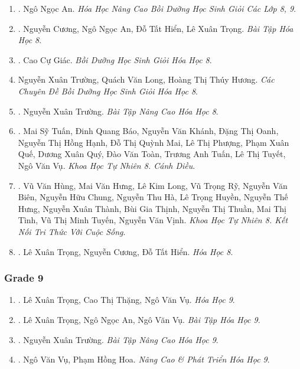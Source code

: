 \documentclass{article}
\begin{document}
\begin{enumerate}
	\item \cite{An_Hoa_Hoc_nang_cao_8_9}. Ngô Ngọc An. \textit{Hóa Học Nâng Cao Bồi Dưỡng Học Sinh Giỏi Các Lớp 8, 9}.\hfill{}
	\item \cite{SBT_Hoa_Hoc_8}. Nguyễn Cương, Ngô Ngọc An, Đỗ Tất Hiển, Lê Xuân Trọng. \textit{Bài Tập Hóa Học 8}.\hfill{\sf[downloaded]}
	\item \cite{Giac2021}. Cao Cự Giác. \textit{Bồi Dưỡng Học Sinh Giỏi Hóa Học 8}.\hfill{\sf[bought]}
	\item Nguyễn Xuân Trường, Quách Văn Long, Hoàng Thị Thúy Hương. \textit{Các Chuyên Đề Bồi Dưỡng Học Sinh Giỏi Hóa Học 8}.
	\item \cite{Truong_BTNC_Hoa_Hoc_8_2022}. Nguyễn Xuân Trường. \textit{Bài Tập Nâng Cao Hóa Học 8}.\hfill{\sf[bought]}
	\item \cite{SGK_KHTN_8_Canh_Dieu}. Mai Sỹ Tuấn, Đinh Quang Báo, Nguyễn Văn Khánh, Đặng Thị Oanh, Nguyễn Thị Hồng Hạnh, Đỗ Thị Quỳnh Mai, Lê Thị Phượng, Phạm Xuân Quế, Dương Xuân Quý, Đào Văn Toàn, Trương Anh Tuấn, Lê Thị Tuyết, Ngô Văn Vụ. \textit{Khoa Học Tự Nhiên 8. Cánh Diều}.\hfill{\sf[downloaded]}
	\item \cite{SGK_KHTN_8_KNTTVCS}. Vũ Văn Hùng, Mai Văn Hưng, Lê Kim Long, Vũ Trọng Rỹ, Nguyễn Văn Biên, Nguyễn Hữu Chung, Nguyễn Thu Hà, Lê Trọng Huyền, Nguyễn Thế Hưng, Nguyễn Xuân Thành, Bùi Gia Thịnh, Nguyễn Thị Thuần, Mai Thị Tình, Vũ Thị Minh Tuyến, Nguyễn Văn Vịnh. \textit{Khoa Học Tự Nhiên 8. Kết Nối Tri Thức Với Cuộc Sống}.\hfill{\sf[downloaded]}
	\item \cite{SGK_Hoa_Hoc_8}. Lê Xuân Trọng, Nguyễn Cương, Đỗ Tất Hiển. \textit{Hóa Học 8}.\hfill{\sf[downloaded]}
\end{enumerate}

\subsubsection{Grade 9}

\begin{enumerate}	
	\item \cite{SGK_Hoa_Hoc_9}. Lê Xuân Trọng, Cao Thị Thặng, Ngô Văn Vụ. \textit{Hóa Học 9}.\hfill{\sf[downloaded]}
	\item \cite{SBT_Hoa_Hoc_9}. Lê Xuân Trọng, Ngô Ngọc An, Ngô Văn Vụ. \textit{Bài Tập Hóa Học 9}.\hfill{\sf[downloaded]}
	\item \cite{Truong_BTNC_Hoa_Hoc_9_2021}. Nguyễn Xuân Trường. \textit{Bài Tập Nâng Cao Hóa Học 9}.\hfill{\sf[bought]}
	\item \cite{Vu_Hoa2021}. Ngô Văn Vụ, Phạm Hồng Hoa. \textit{Nâng Cao \& Phát Triển Hóa Học 9}.\hfill{\sf[bought]}
\end{enumerate}
\end{document}
